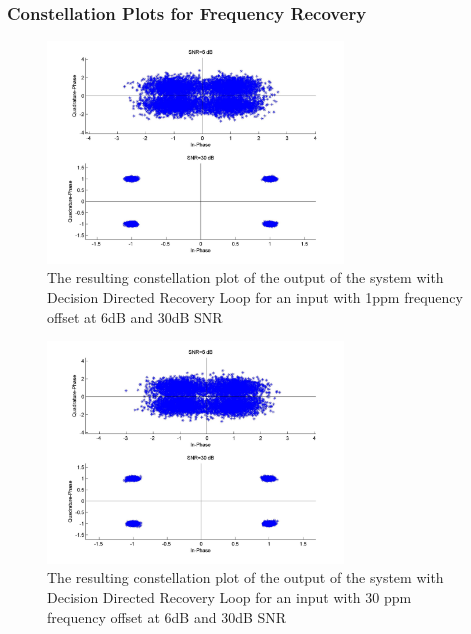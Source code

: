 \documentclass[]{article}
\begin{document}
\subsubsection{Constellation Plots for Frequency Recovery}
\begin{figure}[H]
\centering
\hspace*{-2cm}\includegraphics[width=0.7\textwidth]{qpConstfo_ddr1.jpg}
\caption{The resulting constellation plot of the output of the system with Decision Directed Recovery Loop for an input with 1ppm frequency offset at 6dB and 30dB SNR \label{fig:ddrConstFreq1}}
\end{figure}

\begin{figure}[H]
\centering
\hspace*{-2cm}\includegraphics[width=0.7\textwidth]{qpConstfo_ddr2.jpg}
\caption{The resulting constellation plot of the output of the system with Decision Directed Recovery Loop for an input with 30 ppm frequency offset at 6dB and 30dB SNR \label{fig:ddrConstFreq2}}
\end{figure}
\end{document}
